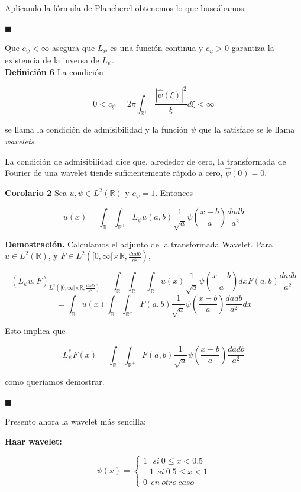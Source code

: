 \begin{itemize}
Aplicando la fórmula de Plancherel obtenemos lo que buscábamos.

\hfill$\blacksquare$

Que $c_\psi < \infty$ asegura que $L_\psi$ es una función continua y $c_\psi > 0$ garantiza la existencia de la inversa de $L_\psi$. \\

\textbf{Definición 6} La condición

$$0 < c_\psi = 2\pi \int_{\mathbb{R}^+} \frac{|\hat{\psi}(\xi)|^2}{\xi} d\xi < \infty$$

se llama la condición de admisibilidad y la función $\psi$ que la satisface se le llama \textit{wavelets}.

La condición de admisibilidad dice que, alrededor de cero, la transformada de Fourier de una wavelet tiende suficientemente rápido a cero, $\hat{\psi}(0) = 0$.

\textbf{Corolario 2} Sea $u, \psi \in L^2(\mathbb{R})$ y $c_\psi = 1$. Entonces

$$u(x) = \int_{\mathbb{R}} \int_{\mathbb{R}^+} L_\psi u(a,b) \frac{1}{\sqrt{a}} \psi\left(\frac{x-b}{a}\right) \frac{da db}{a^2}$$

\textbf{Demostración.} Calculamos el adjunto de la transformada Wavelet. Para $u \in L^2(\mathbb{R})$, y $F \in L^2 \left( [0,\infty[ \times \mathbb{R}, \frac{da db}{a^2}\right)$,

$$(L_\psi u, F)_{L^2 \left( [0,\infty[ \times \mathbb{R}, \frac{da db}{a^2}\right)} = \int_{\mathbb{R}} \int_{\mathbb{R}^+} \int_{\mathbb{R}} u(x) \frac{1}{\sqrt{a}} \psi\left(\frac{x-b}{a}\right)dx F(a,b) \frac{da db}{a^2}$$
$$ = \int_{\mathbb{R}} u(x) \int_{\mathbb{R}} \int_{\mathbb{R}^+} F(a,b) \frac{1}{\sqrt{a}} \psi\left(\frac{x-b}{a}\right) \frac{da db}{a^2}dx $$

Esto implica que

$$L_\psi^* F(x) = \int_{\mathbb{R}} \int_{\mathbb{R}^+} F(a,b) \frac{1}{\sqrt{a}} \psi\left(\frac{x-b}{a}\right) \frac{da db}{a^2}$$

como queríamos demostrar.

\hfill$\blacksquare$

Presento ahora la wavelet más sencilla:

\textbf{Haar wavelet:} 

$$\psi(x) = \begin{cases}
	1 \  \ \ si \ 0 \leq x < 0.5 \\
	-1 \ \  si \ 0.5 \leq x < 1 \\
	0 \ \ en \ otro \ caso
\end{cases}$$


\end{itemize}
